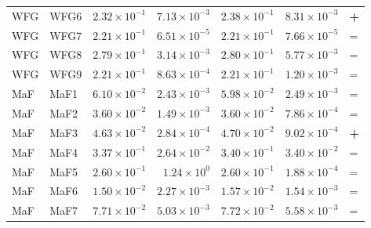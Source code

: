 \begin{table}[t]
\begin{tabular}{llrrrrl}
WFG & WFG6 & $2.32\!\times\!10^{-1}$ & $7.13\!\times\!10^{-3}$ & $2.38\!\times\!10^{-1}$ & $8.31\!\times\!10^{-3}$ & \textbf{+} \\
WFG & WFG7 & $2.21\!\times\!10^{-1}$ & $6.51\!\times\!10^{-5}$ & $2.21\!\times\!10^{-1}$ & $7.66\!\times\!10^{-5}$ & = \\
WFG & WFG8 & $2.79\!\times\!10^{-1}$ & $3.14\!\times\!10^{-3}$ & $2.80\!\times\!10^{-1}$ & $5.77\!\times\!10^{-3}$ & = \\
WFG & WFG9 & $2.21\!\times\!10^{-1}$ & $8.63\!\times\!10^{-4}$ & $2.21\!\times\!10^{-1}$ & $1.20\!\times\!10^{-3}$ & = \\
\addlinespace
MaF & MaF1 & $6.10\!\times\!10^{-2}$ & $2.43\!\times\!10^{-3}$ & $5.98\!\times\!10^{-2}$ & $2.49\!\times\!10^{-3}$ & = \\
MaF & MaF2 & $3.60\!\times\!10^{-2}$ & $1.49\!\times\!10^{-3}$ & $3.60\!\times\!10^{-2}$ & $7.86\!\times\!10^{-4}$ & = \\
MaF & MaF3 & $4.63\!\times\!10^{-2}$ & $2.84\!\times\!10^{-4}$ & $4.70\!\times\!10^{-2}$ & $9.02\!\times\!10^{-4}$ & \textbf{+} \\
MaF & MaF4 & $3.37\!\times\!10^{-1}$ & $2.64\!\times\!10^{-2}$ & $3.40\!\times\!10^{-1}$ & $3.40\!\times\!10^{-2}$ & = \\
MaF & MaF5 & $2.60\!\times\!10^{-1}$ & $1.24\!\times\!10^{0}$ & $2.60\!\times\!10^{-1}$ & $1.88\!\times\!10^{-4}$ & = \\
MaF & MaF6 & $1.50\!\times\!10^{-2}$ & $2.27\!\times\!10^{-3}$ & $1.57\!\times\!10^{-2}$ & $1.54\!\times\!10^{-3}$ & = \\
MaF & MaF7 & $7.71\!\times\!10^{-2}$ & $5.03\!\times\!10^{-3}$ & $7.72\!\times\!10^{-2}$ & $5.58\!\times\!10^{-3}$ & = \\
\bottomrule
\end{tabular}
\end{table}
